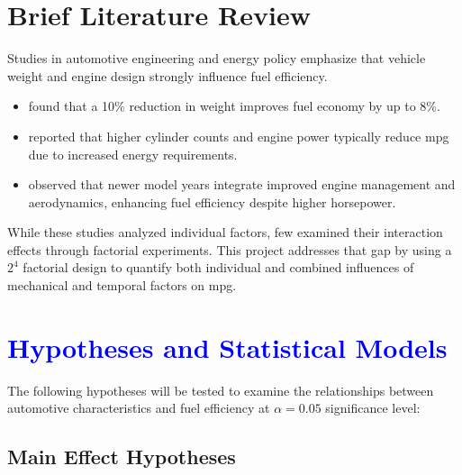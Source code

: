 \documentclass[12pt]{article}
\begin{document}
\section{Brief Literature Review}

Studies in automotive engineering and energy policy emphasize that vehicle weight and engine design strongly influence fuel efficiency.

\begin{itemize}
    \item \cite{ahmad2020} found that a 10\% reduction in weight improves fuel economy by up to 8\%.
    \item \cite{greene2017} reported that higher cylinder counts and engine power typically reduce mpg due to increased energy requirements.
    \item \cite{li2022} observed that newer model years integrate improved engine management and aerodynamics, enhancing fuel efficiency despite higher horsepower.
\end{itemize}

While these studies analyzed individual factors, few examined their interaction effects through factorial experiments. This project addresses that gap by using a $2^4$ factorial design to quantify both individual and combined influences of mechanical and temporal factors on mpg.



\clearpage
\section{\textcolor{blue}{Hypotheses and Statistical Models}}

The following hypotheses will be tested to examine the relationships between automotive characteristics and fuel efficiency at $\alpha = 0.05$ significance level:

\subsection{Main Effect Hypotheses}
\end{document}
